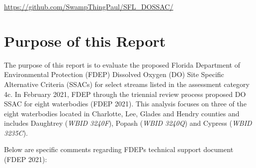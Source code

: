 \documentclass[]{interact}
\theoremstyle{plain}%
\theoremstyle{definition}
\theoremstyle{remark}
\begin{document}
\begin{github}
\url{https://github.com/SwampThingPaul/SFL_DOSSAC/}
\end{github}

\newpage

\hypertarget{purpose-of-this-report}{%
\section{Purpose of this Report}\label{purpose-of-this-report}}

The purpose of this report is to evaluate the proposed Florida
Department of Environmental Protection (FDEP) Dissolved Oxygen (DO) Site
Specific Alternative Criteria (SSACs) for select streams listed in the
assessment category 4c. In February 2021, FDEP through the triennial
review process proposed DO SSAC for eight waterbodies (FDEP 2021). This
analysis focuses on three of the eight waterbodies located in Charlotte,
Lee, Glades and Hendry counties and includes Daughtrey
(\textit{WBID 3240F}), Popash (\textit{WBID 3240Q}) and Cypress
(\textit{WBID 3235C}).

Below are specific comments regarding FDEPs technical support document
(FDEP 2021):
\end{document}
